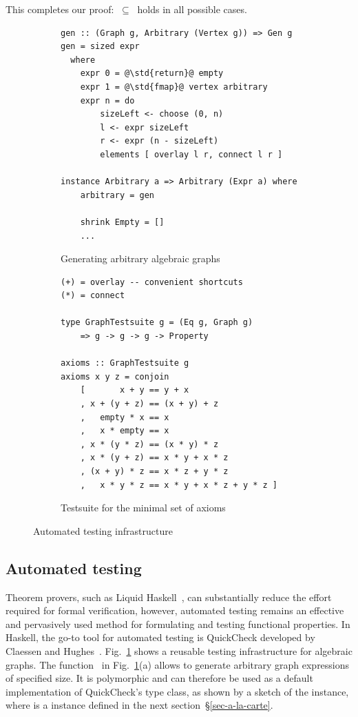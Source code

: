 \noindent
This completes our proof:  $\ \subseteq\ $ 
holds in all possible cases.

\begin{figure}[b]
\vspace{-2mm}
\begin{subfigure}[b]{0.45\linewidth}
\begin{verbatim}
gen :: (Graph g, Arbitrary (Vertex g)) => Gen g
gen = sized expr
  where
    expr 0 = @\std{return}@ empty
    expr 1 = @\std{fmap}@ vertex arbitrary
    expr n = do
        sizeLeft <- choose (0, n)
        l <- expr sizeLeft
        r <- expr (n - sizeLeft)
        elements [ overlay l r, connect l r ]

instance Arbitrary a => Arbitrary (Expr a) where
    arbitrary = gen

    shrink Empty = []
    ...
\end{verbatim}
\caption{Generating arbitrary algebraic graphs}
\end{subfigure}
\hfill
\hfill
\vrule
\hfill
\begin{subfigure}[b]{0.45\linewidth}
\begin{verbatim}
(+) = overlay -- convenient shortcuts
(*) = connect

type GraphTestsuite g = (Eq g, Graph g)
    => g -> g -> g -> Property

axioms :: GraphTestsuite g
axioms x y z = conjoin
    [       x + y == y + x
    , x + (y + z) == (x + y) + z
    ,   empty * x == x
    ,   x * empty == x
    , x * (y * z) == (x * y) * z
    , x * (y + z) == x * y + x * z
    , (x + y) * z == x * z + y * z
    ,   x * y * z == x * y + x * z + y * z ]
\end{verbatim}
\caption{Testsuite for the minimal set of axioms}
\end{subfigure}
\vspace{-3mm}
\caption{Automated testing infrastructure\label{fig-testing}}
\vspace{-3mm}
\end{figure}

\subsection{Automated testing}\label{sub-testing}

Theorem provers, such as Liquid Haskell~\cite{2016_vazou_liquid},
can substantially reduce the effort required for formal verification,
however, automated testing remains an effective and pervasively used
method for formulating and testing functional properties. In Haskell,
the go-to tool for automated testing is QuickCheck developed by
Claessen and Hughes~\citeyear{2011_quickcheck_claessen}.
Fig.~\ref{fig-testing} shows a reusable testing infrastructure for
algebraic graphs. The function~ in Fig.~\ref{fig-testing}(a)
allows to generate arbitrary graph expressions of specified size.
It is polymorphic and can therefore be used as a default implementation
of QuickCheck's  type class, as shown by a sketch of
the  instance, where 
is a  instance defined in the next section~\S\ref{sec-a-la-carte}.

